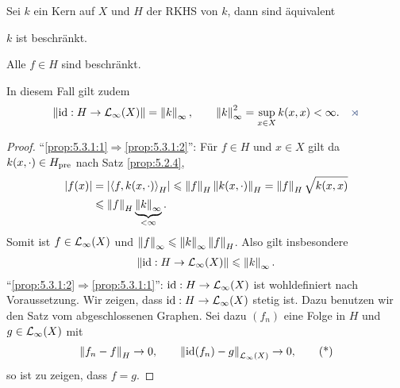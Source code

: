 \begin{lem}
\label{prop:5.3.1}
Sei $k$ ein Kern auf $X$ und $H$ der RKHS von $k$, dann sind äquivalent
\begin{equivenum}
\item\label{prop:5.3.1:1} $k$ ist beschränkt.
\item\label{prop:5.3.1:2} Alle $f\in H$ sind beschränkt.
\end{equivenum}
In diesem Fall gilt zudem
\begin{align*}
\norm{\id: H\to \LL_\infty(X)} = \norm{k}_\infty ,\qquad
\norm{k}^2_\infty = \sup_{x\in X} k(x,x) < \infty.\fishhere
\end{align*}
% 
\end{lem}
\begin{proof}
"`\ref{prop:5.3.1:1}$\Rightarrow$\ref{prop:5.3.1:2}"': Für $f\in H$ und $x\in X$
gilt da $k(x,\cdot)\in H_{\mathrm{pre}}$ nach Satz \ref{prop:5.2.4},
\begin{align*}
\left|f(x)\right| &= \left|\left\langle f,k(x,\cdot)\right\rangle_H\right| \leqslant \left\|f\right\|_H\left\|k(x,\cdot)\right\|_H
= \left\|f\right\|_H \sqrt{k(x,x)}\\
&\leqslant \left\|f\right\|_H \underbrace{\left\|k\right\|_\infty}_{< \infty}.
\end{align*}
Somit ist $f\in \mathcal{L}_\infty(X)$ und $\left\|f\right\|_\infty \leqslant \left\|k\right\|_\infty
\left\|f\right\|_H$.
Also gilt insbesondere
\begin{align*}
\left\|\operatorname{id} : H\to \mathcal{L}_\infty(X)\right\| \leqslant \left\|k\right\|_\infty.
\end{align*}
"`\ref{prop:5.3.1:2}$\Rightarrow$\ref{prop:5.3.1:1}"': $\operatorname{id}: H\to \mathcal{L}_\infty(X)$
ist wohldefiniert nach Voraussetzung. Wir zeigen, dass $\operatorname{id}: H\to \mathcal{L}_\infty(X)$
stetig ist. Dazu benutzen wir den Satz vom abgeschlossenen Graphen. Sei dazu
$(f_n)$ eine Folge in $H$ und $g\in \mathcal{L}_\infty(X)$ mit
\begin{align*}
\left\|f_n-f\right\|_H \to 0,\qquad \left\|\operatorname{id}(f_n) - g\right\|_{\mathcal{L}_\infty(X)} \to 0,\tag{*}
\end{align*}
so ist zu zeigen, dass $f=g$.


\end{proof}
